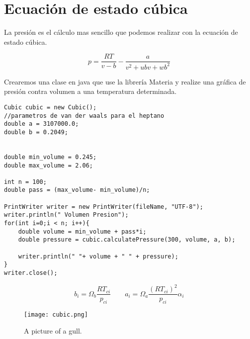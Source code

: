 \section{Ecuación de estado cúbica}
 La presión es el cálculo mas sencillo que podemos realizar con la ecuación de estado cúbica.

\begin{equation}
	p = \frac{R T}{v-b} - \frac{a}{v^2 +u b v + w b^2 }
\end{equation}

 Crearemos una clase en java que use la librería Materia y realize una gráfica de presión contra volumen a una temperatura determinada.






\begin{lstlisting}[label=se,caption=Some Code]
Cubic cubic = new Cubic();
//parametros de van der waals para el heptano
double a = 3107000.0;
double b = 0.2049;


double min_volume = 0.245;
double max_volume = 2.06;

int n = 100;
double pass = (max_volume- min_volume)/n;

PrintWriter writer = new PrintWriter(fileName, "UTF-8");
writer.println(" Volumen Presion");
for(int i=0;i < n; i++){
	double volume = min_volume + pass*i;
	double pressure = cubic.calculatePressure(300, volume, a, b);
	
	writer.println(" "+ volume + " " + pressure);
}
writer.close();		
\end{lstlisting}


\begin{equation}
	b_i = \Omega_b \frac{R T_{ci}}{p_{ci}} \qquad a_i = \Omega_a \frac{\left(R T_{ci}\right)^2}{p_{ci}} \alpha_i
\end{equation}

\begin{figure}[!h]
  
  \centering
    \texttt{[image: cubic.png]}
    \caption{A picture of a gull.}
\end{figure}








